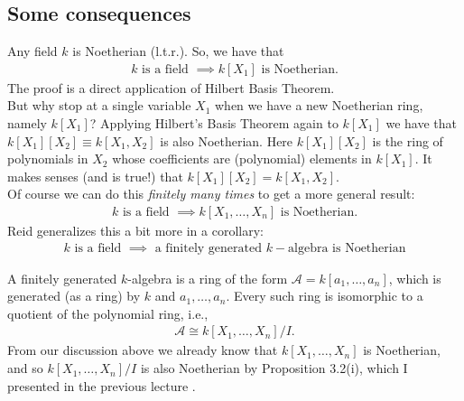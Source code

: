 \documentclass[12pt]{article}
\begin{document}
\newpage

\subsection{Some consequences}


Any field $k$ is Noetherian (l.t.r.). So, we have that
\begin{align*}
{k \text{ is a field } \implies k[X_1] \text{ is Noetherian.}} 
\end{align*}
The proof is a direct application of Hilbert Basis Theorem. \\

But why stop at a single variable $X_1$ when we have a new Noetherian ring, namely $k[X_1]$? Applying Hilbert's Basis Theorem again to $k[X_1]$ we have that $k[X_1][X_2] \equiv k[X_1,X_2]$ is also Noetherian. Here $k[X_1][X_2]$ is the ring of polynomials in $X_2$ whose coefficients are (polynomial) elements in $k[X_1]$. It makes senses (and is true!) that $k[X_1][X_2] = k[X_1,X_2]$. \\

 Of course we can do this \textit{finitely many times} to get a more general result:
\begin{align*}
{k \text{ is a field } \implies k[X_1,\dots,X_n] \text{ is Noetherian.}} 
\end{align*}
\noindent Reid generalizes this a bit more in a  corollary: 
\begin{align*}
\boxed{k \text{ is a field } \implies \text{ a finitely generated }k-\text{algebra is Noetherian}} 
\end{align*}

A finitely generated $k$-algebra is a ring of the form $\mathcal{A} = k[a_1,\dots,a_n]$, which is generated (as a ring) by $k$ and $a_1,\dots,a_n$. Every such ring is isomorphic to a quotient of the polynomial ring, i.e.,
\begin{align*}
\mathcal{A} \cong k[X_1,\dots,X_n]/I.
\end{align*}
From our discussion above we already know that $k[X_1,\dots,X_n]$ is Noetherian, and so $k[X_1,\dots,X_n]/I$ is also Noetherian by Proposition 3.2(i), which I presented in the previous lecture \smiley{}.
\end{document}
